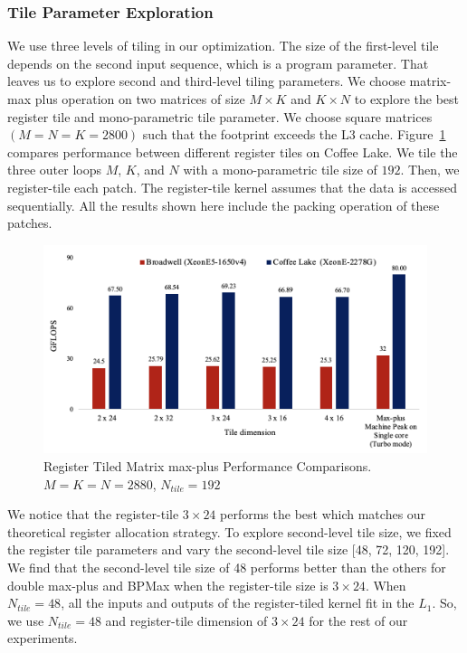 \subsubsection{Tile Parameter Exploration}
We use three levels of tiling in our optimization. The size of the first-level tile depends on the second input sequence, which is a program parameter. That leaves us to explore second and third-level tiling parameters. We choose matrix-max plus operation on two matrices of size $M \times K$ and $K \times N$ to explore the best register tile and mono-parametric tile parameter. We choose square matrices $(M = N = K = 2800)$ such that the footprint exceeds the L3 cache.
Figure~\ref{fig:register_tile_performance_comparison} compares performance between different register tiles on Coffee Lake. We tile the three outer loops $M$, $K$, and $N$ with a mono-parametric tile size of $192$. Then, we register-tile each patch. The register-tile kernel assumes that the data is accessed sequentially. All the results shown here include the packing operation of these patches.
\begin{figure}[htbp]
    \centering
    \includegraphics[scale=0.4, trim=4 4 4 4,clip]{content/figures/max_plus_register_tile_performance.png}
   \caption{Register Tiled Matrix max-plus Performance Comparisons. $M = K = N = 2880$, $N_{tile}= 192$}
\label{fig:register_tile_performance_comparison}
\end{figure}
We notice that the register-tile $3 \times 24$ performs the best which matches our theoretical register allocation strategy. 
To explore second-level tile size, we fixed the register tile parameters and vary the second-level tile size [48, 72, 120, 192]. We find that the second-level tile size of 48 performs better than the others for double max-plus and BPMax when the register-tile size is $3 \times 24$. When $N_{tile}=48$, all the inputs and outputs of the register-tiled kernel fit in the $L_{1}$. So, we use $N_{tile}=48$ and register-tile dimension of $3 \times 24$ for the rest of our experiments.
